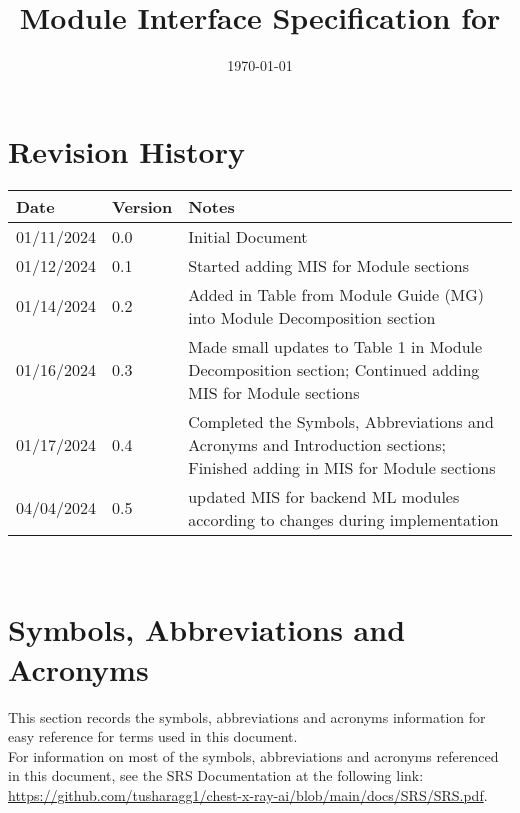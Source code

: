 \documentclass[12pt, titlepage]{article}
\begin{document}
\title{Module Interface Specification for \progname{}}

\author{\authname}

\date{\today}

\maketitle


\section{Revision History}

\begin{tabularx}{\textwidth}{p{3cm}p{2cm}X}
\toprule {\bf Date} & {\bf Version} & {\bf Notes} \\
\midrule
01/11/2024 & 0.0 & Initial Document \\
01/12/2024 & 0.1 & Started adding MIS for Module sections \\
01/14/2024 & 0.2 & Added in Table from Module Guide (MG) into Module
  Decomposition section \\
01/16/2024 & 0.3 & Made small updates to Table 1 in Module Decomposition
  section; Continued adding MIS for Module sections \\
01/17/2024 & 0.4 & Completed the Symbols, Abbreviations and Acronyms and
  Introduction sections; Finished adding in MIS for Module sections \\
04/04/2024 & 0.5 & updated MIS for backend ML modules according to changes during implementation \\
\bottomrule
\end{tabularx}

~\newpage

\section{Symbols, Abbreviations and Acronyms}

This section records the symbols, abbreviations and acronyms information for
easy reference for terms used in this document. \\

For information on most of the symbols, abbreviations and acronyms referenced
in this document, see the SRS Documentation at the following link:
\url{https://github.com/tusharagg1/chest-x-ray-ai/blob/main/docs/SRS/SRS.pdf}. \\
\end{document}
